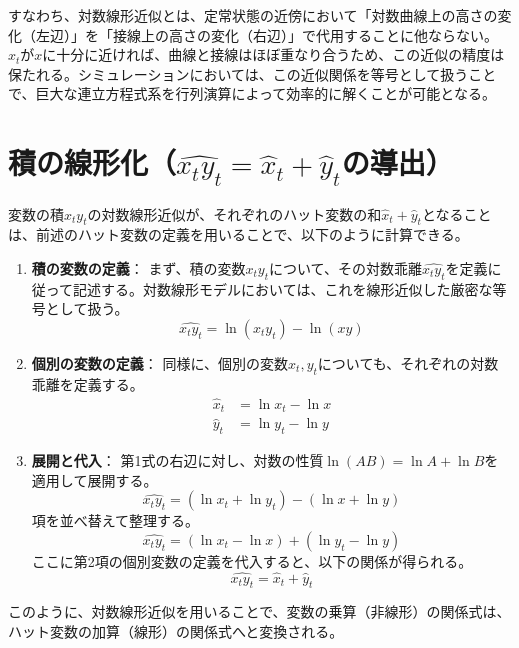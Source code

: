すなわち、対数線形近似とは、定常状態の近傍において「対数曲線上の高さの変化（左辺）」を「接線上の高さの変化（右辺）」で代用することに他ならない。
\(x_t\)が\(x\)に十分に近ければ、曲線と接線はほぼ重なり合うため、この近似の精度は保たれる。シミュレーションにおいては、この近似関係を等号として扱うことで、巨大な連立方程式系を行列演算によって効率的に解くことが可能となる。

\section{積の線形化（\(\widehat{x_ty_t}=\hat{x}_t+\hat{y}_t\)の導出）}
\label{sec:appendix_log_linearization_product}

変数の積\(x_ty_t\)の対数線形近似が、それぞれのハット変数の和\(\hat{x}_t+\hat{y}_t\)となることは、前述のハット変数の定義を用いることで、以下のように計算できる。

\begin{enumerate}
    \item\label{itm:appendix_log_linearization_product_def_step} \textbf{積の変数の定義}：
    まず、積の変数\(x_ty_t\)について、その対数乖離\(\widehat{x_ty_t}\)を定義に従って記述する。対数線形モデルにおいては、これを線形近似した厳密な等号として扱う。
    \begin{equation}
        \widehat{x_ty_t}=\ln(x_ty_t)-\ln(xy)
        \label{eq:appendix_log_linearization_product_def}
    \end{equation}
    
    \item\label{itm:appendix_log_linearization_product_indiv_def} \textbf{個別の変数の定義}：
    同様に、個別の変数\(x_t,y_t\)についても、それぞれの対数乖離を定義する。
    \begin{align}
        \hat{x}_t&=\ln x_t-\ln x \label{eq:appendix_log_linearization_product_x_hat} \\
        \hat{y}_t&=\ln y_t-\ln y \label{eq:appendix_log_linearization_product_y_hat}
    \end{align}

    \item\label{itm:appendix_log_linearization_product_expand_subst} \textbf{展開と代入}：
    第1式の右辺に対し、対数の性質\(\ln(AB)=\ln A+\ln B\)を適用して展開する。
    \begin{equation}
        \widehat{x_ty_t}=(\ln x_t+\ln y_t)-(\ln x+\ln y)
        \label{eq:appendix_log_linearization_product_expand}
    \end{equation}
    項を並べ替えて整理する。
    \begin{equation}
        \widehat{x_ty_t}=(\ln x_t-\ln x)+(\ln y_t-\ln y)
        \label{eq:appendix_log_linearization_product_rearrange}
    \end{equation}
    ここに第2項の個別変数の定義を代入すると、以下の関係が得られる。
    \begin{equation}
        \widehat{x_ty_t}=\hat{x}_t+\hat{y}_t
        \label{eq:appendix_log_linearization_product_final}
    \end{equation}
\end{enumerate}

このように、対数線形近似を用いることで、変数の乗算（非線形）の関係式は、ハット変数の加算（線形）の関係式へと変換される。